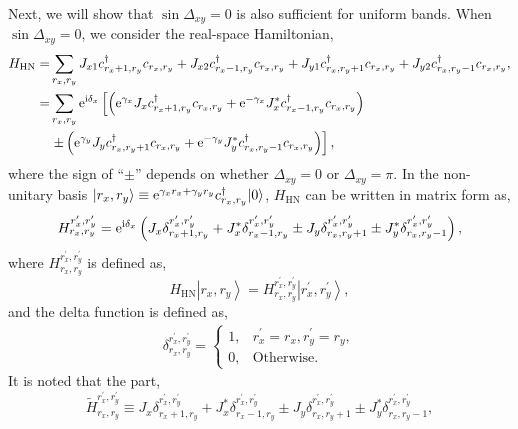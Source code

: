 \documentclass[pdflatex,sn-nature, iicol]{sn-jnl}%
\theoremstyle{thmstyleone}%
\theoremstyle{thmstyletwo}%
\theoremstyle{thmstylethree}%
\begin{document}
Next, we will show that $\sin\Delta_{xy}=0$ is also sufficient for
uniform bands. When $\sin\Delta_{xy}=0$, we consider the real-space
Hamiltonian, 
\begin{align}
H_{\text{HN}}= & \sum_{r_{x},r_{y}}J_{x1}c_{r_{x}+1,r_{y}}^{\dagger}c_{r_{x},r_{y}}+J_{x2}c_{r_{x}-1,r_{y}}^{\dagger}c_{r_{x},r_{y}}+J_{y1}c_{r_{x},r_{y}+1}^{\dagger}c_{r_{x},r_{y}}+J_{y2}c_{r_{x},r_{y}-1}^{\dagger}c_{r_{x},r_{y}},\nonumber \\
= & \sum_{r_{x},r_{y}}\mathrm{e}^{\mathrm{i}\delta_{x}}\left[\left(\mathrm{e}^{\gamma_{x}}J_{x}c_{r_{x}+1,r_{y}}^{\dagger}c_{r_{x},r_{y}}+\mathrm{e}^{-\gamma_{x}}J_{x}^{*}c_{r_{x}-1,r_{y}}^{\dagger}c_{r_{x},r_{y}}\right)\right.\nonumber \\
 & \left.\pm\left(\mathrm{e}^{\gamma_{y}}J_{y}c_{r_{x},r_{y}+1}^{\dagger}c_{r_{x},r_{y}}+\mathrm{e}^{-\gamma_{y}}J_{y}^{*}c_{r_{x},r_{y}-1}^{\dagger}c_{r_{x},r_{y}}\right)\right],
\end{align}
where the sign of ``$\pm$'' depends on whether $\Delta_{xy}=0$
or $\Delta_{xy}=\pi$. In the non-unitary basis $|r_{x},r_{y}\rangle\equiv\mathrm{e}^{\gamma_{x}r_{x}+\gamma_{y}r_{y}}c_{r_{x},r_{y}}^{\dagger}|0\rangle$,
$H_{\text{HN}}$ can be written in matrix form as, 
\begin{equation}
H_{r_{x},r_{y}}^{r_{x}^{\prime},r_{y}^{\prime}}=\mathrm{e}^{\mathrm{i}\delta_{x}}\left(J_{x}\delta_{r_{x}+1,r_{y}}^{r_{x}^{\prime},r_{y}^{\prime}}+J_{x}^{*}\delta_{r_{x}-1,r_{y}}^{r_{x}^{\prime},r_{y}^{\prime}}\pm J_{y}\delta_{r_{x},r_{y}+1}^{r_{x}^{\prime},r_{y}^{\prime}}\pm J_{y}^{*}\delta_{r_{x},r_{y}-1}^{r_{x}^{\prime},r_{y}^{\prime}}\right),
\end{equation}
where $H_{r_{x},r_{y}}^{r_{x}^{\prime},r_{y}^{\prime}}$ is defined
as, 
\begin{equation}
H_{\text{HN}}\left|r_{x},r_{y}\right>=H_{r_{x},r_{y}}^{r_{x}^{\prime},r_{y}^{\prime}}\left|r_{x}^{\prime},r_{y}^{\prime}\right>,
\end{equation}
and the delta function is defined as, 
\begin{align}
\delta_{r_{x},r_{y}}^{r_{x}^{\prime},r_{y}^{\prime}}=\begin{cases}
1, & r_{x}^{\prime}=r_{x},r_{y}^{\prime}=r_{y},\\
0, & \text{Otherwise}.
\end{cases}
\end{align}
It is noted that the part, 
\begin{equation}
\tilde{H}_{r_{x},r_{y}}^{r_{x}^{\prime},r_{y}^{\prime}}\equiv J_{x}\delta_{r_{x}+1,r_{y}}^{r_{x}^{\prime},r_{y}^{\prime}}+J_{x}^{*}\delta_{r_{x}-1,r_{y}}^{r_{x}^{\prime},r_{y}^{\prime}}\pm J_{y}\delta_{r_{x},r_{y}+1}^{r_{x}^{\prime},r_{y}^{\prime}}\pm J_{y}^{*}\delta_{r_{x},r_{y}-1}^{r_{x}^{\prime},r_{y}^{\prime}},
\end{equation}
\end{document}
